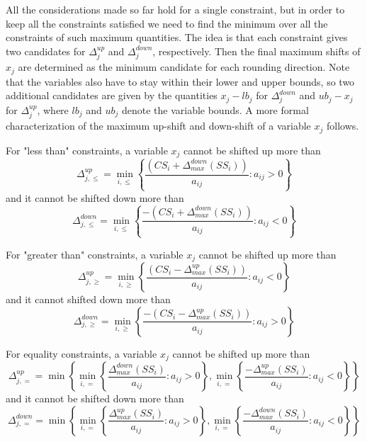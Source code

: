 \documentclass[a4paper,12pt]{book}
\begin{document}
All the considerations made so far hold for a single constraint, but in order to keep all the constraints satisfied we need to find the minimum over all the constraints of such maximum quantities. The idea is that each constraint gives two candidates for $\Delta_{j}^{up}$ and $\Delta_{j}^{down}$, respectively. Then the final maximum shifts of $x_j$ are determined as the minimum candidate for each rounding direction. 
Note that the variables also have to stay within their lower and upper bounds, so two additional candidates are given by the quantities $x_j - lb_j$ for $\Delta_{j}^{down}$ and $ub_j - x_j$ for $\Delta_{j}^{up}$, where $lb_j$ and $ub_j$ denote the variable bounds.
A more formal characterization of the maximum up-shift and down-shift of a variable $x_j$ follows. \par

For "less than" constraints, a variable $x_j$ cannot be shifted up more than
\begin{equation}
	\Delta_{j,\leq}^{up} = \min_{i,\leq}\left\{\dfrac{(CS_i + \Delta_{max}^{down}(SS_i))}{a_{ij}} : a_{ij} > 0\right\}
\end{equation}
and it cannot be shifted down more than
\begin{equation}
	\Delta_{j,\leq}^{down} = \min_{i,\leq}\left\{\dfrac{-(CS_i + \Delta_{max}^{down}(SS_i))}{a_{ij}} : a_{ij} < 0\right\}
\end{equation}

For "greater than" constraints, a variable $x_j$ cannot be shifted up more than
\begin{equation}
	\Delta_{j,\geq}^{up} = \min_{i,\geq}\left\{\dfrac{(CS_i - \Delta_{max}^{up}(SS_i))}{a_{ij}} : a_{ij} < 0\right\}
\end{equation}
and it cannot shifted down more than
\begin{equation}
	\Delta_{j,\geq}^{down} = \min_{i,\geq}\left\{\dfrac{-(CS_i - \Delta_{max}^{up}(SS_i))}{a_{ij}} : a_{ij} > 0\right\}
\end{equation}

For equality constraints, a variable $x_j$ cannot be shifted up more than
\begin{equation}
	\Delta_{j,=}^{up} = \min \left\{ \min_{i,=}\left\{\dfrac{\Delta_{max}^{down}(SS_i)}{a_{ij}} : a_{ij} > 0\right\} , \min_{i,=}\left\{\dfrac{-\Delta_{max}^{up}(SS_i)}{a_{ij}} : a_{ij} < 0 \right\} \right\}
\end{equation}
and it cannot be shifted down more than
\begin{equation}
	\Delta_{j,=}^{down} = \min \left\{ \min_{i,=}\left\{\dfrac{\Delta_{max}^{up}(SS_i)}{a_{ij}} : a_{ij} > 0\right\} , \min_{i,=}\left\{\dfrac{-\Delta_{max}^{down}(SS_i)}{a_{ij}} : a_{ij} < 0 \right\} \right\}
\end{equation}
\end{document}
